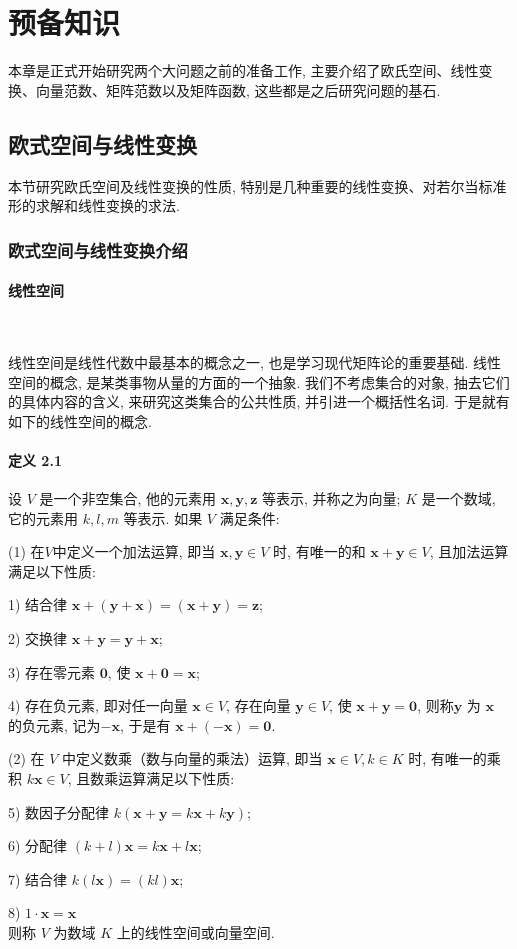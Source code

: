 \section{预备知识}

本章是正式开始研究两个大问题之前的准备工作, 主要介绍了欧氏空间、线性变
换、向量范数、矩阵范数以及矩阵函数, 这些都是之后研究问题的基石.

\subsection{欧式空间与线性变换}

本节研究欧氏空间及线性变换的性质, 特别是几种重要的线性变换、对若尔当标准形的求解和线性变换的求法.

\subsubsection{欧式空间与线性变换介绍}

\paragraph*{线性空间} \

\par 线性空间是线性代数中最基本的概念之一, 也是学习现代矩阵论的重要基础. 线性空间的概念, 是某类事物从量的方面的一个抽象. 我们不考虑集合的对象, 抽去它们的具体内容的含义, 来研究这类集合的公共性质, 并引进一个概括性名词. 于是就有如下的线性空间的概念.

\paragraph*{定义 2.1} 设 $V$ 是一个非空集合, 他的元素用 $\bm{x},\bm{y},\bm{z}$ 等表示, 并称之为向量; $K$ 是一个数域, 它的元素用 $k, l, m$ 等表示. 如果 $V$ 满足条件:
\par (1) 在$V$中定义一个加法运算, 即当 $\bm{x}, \bm{y} \in V$ 时, 有唯一的和 $\bm{x} + \bm{y} \in V$, 且加法运算满足以下性质:
\par 1) 结合律 $\bm{x} + (\bm{y} + \bm{x}) = (\bm{x} + \bm{y}) = \bm{z}$;
\par 2) 交换律 $\bm{x} + \bm{y} = \bm{y} + \bm{x}$;
\par 3) 存在零元素 $\bm{0}$, 使 $\bm{x} + \bm{0} = \bm{x}$;
\par 4) 存在负元素, 即对任一向量 $\bm{x}\in V$, 存在向量 $\bm{y} \in V$, 使 $\bm{x + y = 0}$, 则称$\bm{y}$ 为 $\bm{x}$
的负元素, 记为$\bm{-x}$, 于是有 $\bm{x + (- x) = 0}$.
\par (2) 在 $V$ 中定义数乘（数与向量的乘法）运算, 即当 $\bm{x} \in V, k \in K$ 时, 有唯一的乘
积 $k\bm{x} \in V$, 且数乘运算满足以下性质:
\par 5) 数因子分配律 $k(\bm{x + y} = k \bm{x} + k \bm{y})$;
\par 6) 分配律 $(k + l) \bm{x} = k \bm{x} + l \bm{x}$;
\par 7) 结合律 $k(l \bm{x}) = (kl) \bm{x}$;
\par 8) $1 \cdot \bm{x} = \bm{x}$ \\
则称 $V$ 为数域 $K$ 上的线性空间或向量空间.

